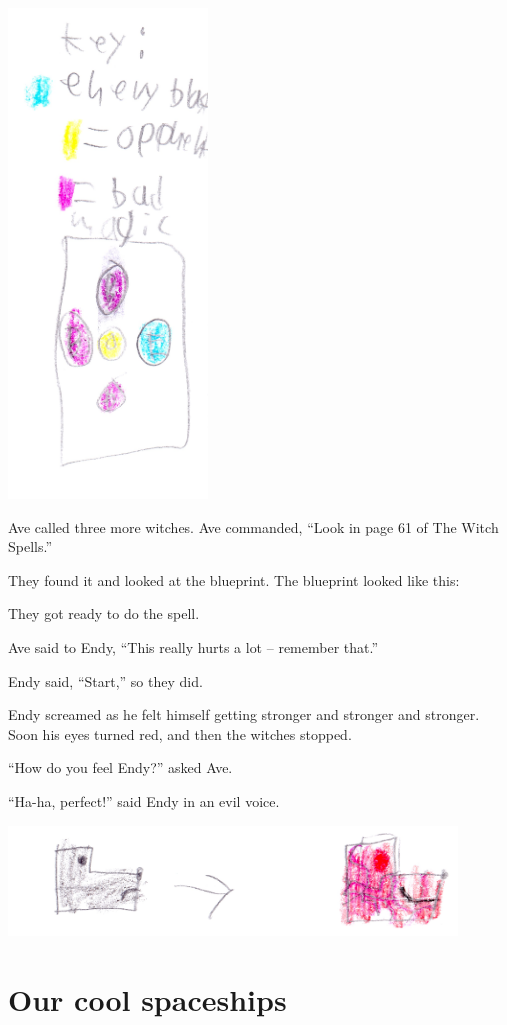 \documentclass[12pt,twoside]{krantz}
\begin{document}
\includegraphics[width=2.08333in,height=\textheight]{img/four-bad-guys/key.jpg}

Ave called three more witches. Ave commanded, ``Look in page 61 of The
Witch Spells.''

They found it and looked at the blueprint. The blueprint looked like
this:

They got ready to do the spell.

Ave said to Endy, ``This really hurts a lot -- remember that.''

Endy said, ``Start,'' so they did.

Endy screamed as he felt himself getting stronger and stronger and
stronger. Soon his eyes turned red, and then the witches stopped.

``How do you feel Endy?'' asked Ave.

``Ha-ha, perfect!'' said Endy in an evil voice.

\includegraphics[width=4.6875in,height=\textheight]{img/four-bad-guys/endy.jpg}

\hypertarget{our-cool-spaceships}{%
\section{Our cool spaceships}\label{our-cool-spaceships}}
\end{document}

